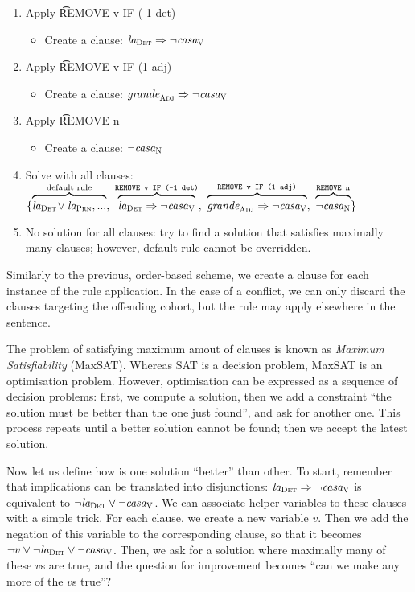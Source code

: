 \begin{enumerate}
\item Apply \t{REMOVE v IF (-1 det)}
 \begin{itemize}
    \item Create a clause: $\text{\em la}_{\text{\sc Det}} \Rightarrow \neg \text{\em casa}_{\text{\sc V}}$
 \end{itemize}
\item Apply \t{REMOVE v IF (1 adj)} 
 \begin{itemize}
    \item Create a clause: $\text{\em grande}_{\text{\sc Adj}} \Rightarrow \neg \text{\em casa}_{\text{\sc V}}$
 \end{itemize}
\item Apply \t{REMOVE n}
 \begin{itemize}
    \item Create a clause: $\neg \text{\em casa}_{\text{\sc N}}$
 \end{itemize}

\item Solve with all clauses:
  $\{ \ob{\laDet \! \vee \laPrn, ...}^{\text{default rule}}, \ 
      \ob{\laDet \Rightarrow \neg \casaV}^{\t{REMOVE v IF (-1 det)}}, \ 
      \ob{\grandeAdj \Rightarrow \neg \casaV}^{\t{REMOVE v IF (1 adj)}}, \ 
      \ob{\neg \casaN}^{\t{REMOVE n}} \}$
\item No solution for all clauses: try to find a solution that satisfies maximally many clauses; however, default rule cannot be overridden.
\end{enumerate}

Similarly to the previous, order-based scheme, we create a clause for each 
instance of the rule application. In the case of a conflict, we can 
only discard the clauses targeting the offending cohort, but the rule may apply 
elsewhere in the sentence.


The problem of satisfying maximum amout of clauses is known as \emph{Maximum Satisfiability} (MaxSAT).
Whereas SAT is a decision problem, MaxSAT is an optimisation problem.
However, optimisation can be expressed as a sequence of decision problems:
first, we compute a solution, then we add a constraint ``the solution must be better than the one just found'', and ask for another one. 
This process repeats until a better solution cannot be found; then we accept the 
latest solution.

Now let us define how is one solution ``better'' than other. 
To start, remember that implications can be translated into disjunctions: 
$\text{\em la}_{\text{\sc Det}} \Rightarrow \neg\text{\em casa}_{\text{\sc V}}$ is equivalent to $\neg\text{\em la}_{\text{\sc Det}} \vee \neg\text{\em casa}_{\text{\sc V}}$. 
We can associate helper variables to these clauses with a simple trick.
For each clause, we create a new variable $v$. Then we add 
the negation of this variable to the corresponding clause, 
so that it becomes $\neg{}v \vee \neg\text{\em la}_{\text{\sc Det}} \vee \neg\text{\em casa}_{\text{\sc V}}$.
Then, we ask for a solution where maximally many of these $v$s are true,
and the question for improvement becomes ``can we make any more of the $v$s true''?


